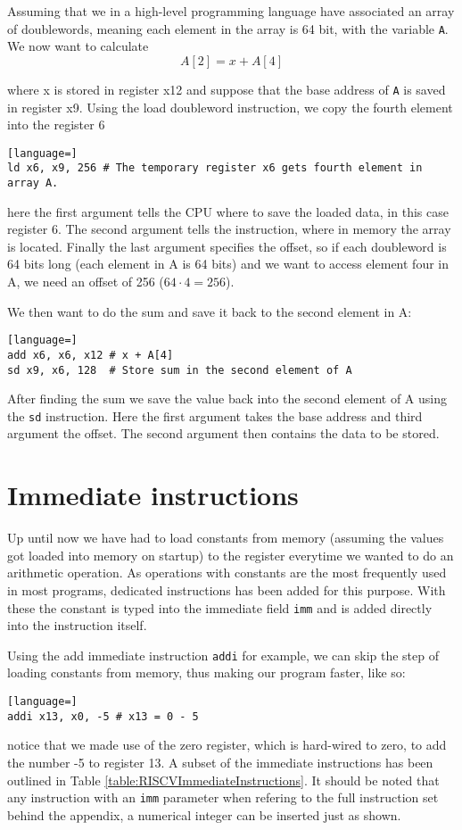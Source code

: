    Assuming that we in a high-level programming language have associated an array of doublewords, meaning each element in the array is 64 bit, with the variable \texttt{A}. We now want to calculate
    \begin{equation}
        A[2] = x + A[4]
    \end{equation}
    
    where x is stored in register x12 and suppose that the base address of \texttt{A} is saved in register x9. Using the load doubleword instruction, we copy the fourth element into the register 6
    \begin{lstlisting}[language=]
ld x6, x9, 256 # The temporary register x6 gets fourth element in array A.
    \end{lstlisting}
    here the first argument tells the CPU where to save the loaded data, in this case register 6. The second argument tells the instruction, where in memory the array is located. Finally the last argument specifies the offset, so if each doubleword is 64 bits long (each element in A is 64 bits) and we want to access element four in A, we need an offset of 256 ($64\cdot 4=256$).
    
    We then want to do the sum and save it back to the second element in A:
    \begin{lstlisting}[language=]
add x6, x6, x12 # x + A[4]
sd x9, x6, 128  # Store sum in the second element of A 
    \end{lstlisting}
    
    After finding the sum we save the value back into the second element of A using the \texttt{sd} instruction. Here the first argument takes the base address and third argument the offset. The second argument then contains the data to be stored. 
    
    
    
\section{Immediate instructions}
    Up until now we have had to load constants from memory (assuming the values got loaded into memory on startup) to the register everytime we wanted to do an arithmetic operation. As operations with constants are the most frequently used in most programs, dedicated instructions has been added for this purpose. With these the constant is typed into the immediate field \texttt{imm} and is added directly into the instruction itself. 
    
    Using the add immediate instruction \texttt{addi} for example, we can skip the step of loading constants from memory, thus making our program faster, like so:
    \begin{lstlisting}[language=]
addi x13, x0, -5 # x13 = 0 - 5
    \end{lstlisting}
    notice that we made use of the zero register, which is hard-wired to zero, to add the number -5 to register 13. A subset of the immediate instructions has been outlined in Table \ref{table:RISCVImmediateInstructions}. It should be noted that any instruction with an \texttt{imm} parameter when refering to the full instruction set behind the appendix, a numerical integer can be inserted just as shown.
    
